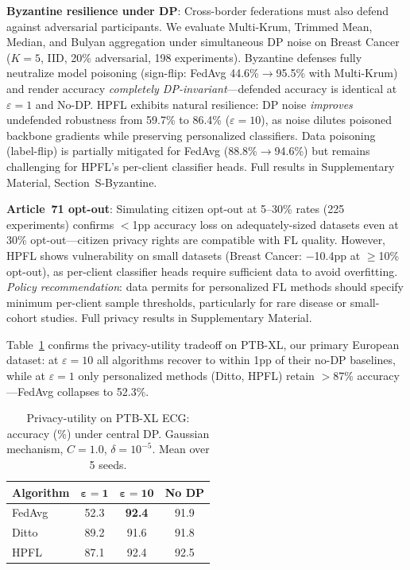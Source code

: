 \documentclass[conference,a4paper]{IEEEtran}
\begin{document}
\textbf{Byzantine resilience under DP}: Cross-border federations must also defend against adversarial participants. We evaluate Multi-Krum, Trimmed Mean, Median, and Bulyan aggregation under simultaneous DP noise on Breast Cancer ($K{=}5$, IID, 20\% adversarial, 198 experiments). Byzantine defenses fully neutralize model poisoning (sign-flip: FedAvg 44.6\%$\to$95.5\% with Multi-Krum) and render accuracy \textit{completely DP-invariant}---defended accuracy is identical at $\varepsilon{=}1$ and No-DP. HPFL exhibits natural resilience: DP noise \textit{improves} undefended robustness from 59.7\% to 86.4\% ($\varepsilon{=}10$), as noise dilutes poisoned backbone gradients while preserving personalized classifiers. Data poisoning (label-flip) is partially mitigated for FedAvg (88.8\%$\to$94.6\%) but remains challenging for HPFL's per-client classifier heads. Full results in Supplementary Material, Section~S-Byzantine.

\textbf{Article~71 opt-out}: Simulating citizen opt-out at 5--30\% rates (225 experiments) confirms $<$1pp accuracy loss on adequately-sized datasets even at 30\% opt-out---citizen privacy rights are compatible with FL quality. However, HPFL shows vulnerability on small datasets (Breast Cancer: $-$10.4pp at $\geq$10\% opt-out), as per-client classifier heads require sufficient data to avoid overfitting. \textit{Policy recommendation}: data permits for personalized FL methods should specify minimum per-client sample thresholds, particularly for rare disease or small-cohort studies. Full privacy results in Supplementary Material.

Table~\ref{tab:dp_mini} confirms the privacy-utility tradeoff on PTB-XL, our primary European dataset: at $\varepsilon{=}10$ all algorithms recover to within 1pp of their no-DP baselines, while at $\varepsilon{=}1$ only personalized methods (Ditto, HPFL) retain $>$87\% accuracy---FedAvg collapses to 52.3\%.

\begin{table}[htbp]
\centering
\caption{Privacy-utility on PTB-XL ECG: accuracy (\%) under central DP. Gaussian mechanism, $C{=}1.0$, $\delta{=}10^{-5}$. Mean over 5 seeds.}
\label{tab:dp_mini}
\small
\begin{tabular}{lccc}
\toprule
\textbf{Algorithm} & $\boldsymbol{\varepsilon{=}1}$ & $\boldsymbol{\varepsilon{=}10}$ & \textbf{No DP} \\
\midrule
FedAvg & 52.3 & \textbf{92.4} & 91.9 \\
Ditto & 89.2 & 91.6 & 91.8 \\
HPFL & 87.1 & 92.4 & 92.5 \\
\bottomrule
\end{tabular}
\end{table}
\end{document}
